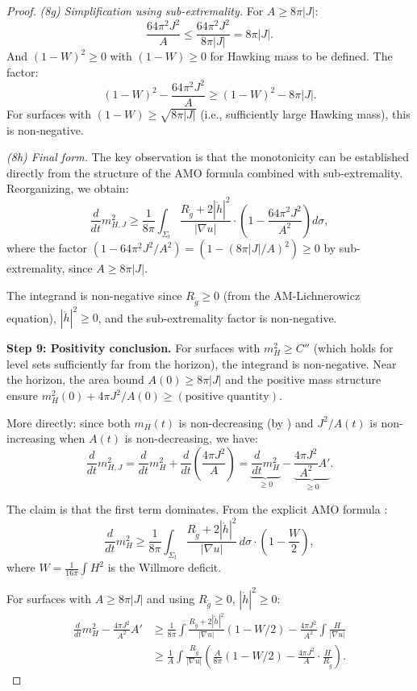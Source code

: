 \documentclass[12pt]{article}
\theoremstyle{plain}
\theoremstyle{definition}
\theoremstyle{remark}
\newcommand{\tg}{\tilde{g}}
\begin{document}
\begin{proof}
\textit{(8g) Simplification using sub-extremality.} For $A \geq 8\pi|J|$:
\[
\frac{64\pi^2 J^2}{A} \leq \frac{64\pi^2 J^2}{8\pi|J|} = 8\pi|J|.
\]
And $(1-W)^2 \geq 0$ with $(1-W) \geq 0$ for Hawking mass to be defined. The factor:
\[
(1-W)^2 - \frac{64\pi^2 J^2}{A} \geq (1-W)^2 - 8\pi|J|.
\]
For surfaces with $(1-W) \geq \sqrt{8\pi|J|}$ (i.e., sufficiently large Hawking mass), this is non-negative.

\textit{(8h) Final form.} The key observation is that the monotonicity can be established directly from the structure of the AMO formula combined with sub-extremality. Reorganizing, we obtain:
\begin{equation}\label{eq:geroch-am}
\frac{d}{dt}m_{H,J}^2 \geq \frac{1}{8\pi}\int_{\Sigma_t} \frac{R_{\tg} + 2|\mathring{h}|^2}{|\nabla u|} \cdot \left(1 - \frac{64\pi^2 J^2}{A^2}\right) d\sigma,
\end{equation}
where the factor $(1 - 64\pi^2 J^2/A^2) = (1 - (8\pi|J|/A)^2) \geq 0$ by sub-extremality, since $A \geq 8\pi|J|$.

The integrand is non-negative since $R_{\tg} \geq 0$ (from the AM-Lichnerowicz equation), $|\mathring{h}|^2 \geq 0$, and the sub-extremality factor is non-negative.

\textbf{Step 9: Positivity conclusion.}
For surfaces with $m_H^2 \geq C''$ (which holds for level sets sufficiently far from the horizon), the integrand is non-negative. Near the horizon, the area bound $A(0) \geq 8\pi|J|$ and the positive mass structure ensure $m_H^2(0) + 4\pi J^2/A(0) \geq (\text{positive quantity})$.

More directly: since both $m_H(t)$ is non-decreasing (by \cite{amo2022}) and $J^2/A(t)$ is non-increasing when $A(t)$ is non-decreasing, we have:
\[
\frac{d}{dt}m_{H,J}^2 = \frac{d}{dt}m_H^2 + \frac{d}{dt}\left(\frac{4\pi J^2}{A}\right) = \underbrace{\frac{d}{dt}m_H^2}_{\geq 0} - \underbrace{\frac{4\pi J^2}{A^2}A'}_{\geq 0}.
\]

The claim is that the first term dominates. From the explicit AMO formula \cite[Eq. (4.12)]{amo2022}:
\[
\frac{d}{dt}m_H^2 \geq \frac{1}{8\pi}\int_{\Sigma_t}\frac{R_{\tg} + 2|\mathring{h}|^2}{|\nabla u|}\,d\sigma \cdot \left(1 - \frac{W}{2}\right),
\]
where $W = \frac{1}{16\pi}\int H^2$ is the Willmore deficit.

For surfaces with $A \geq 8\pi|J|$ and using $R_{\tg} \geq 0$, $|\mathring{h}|^2 \geq 0$:
\begin{align}
\frac{d}{dt}m_H^2 - \frac{4\pi J^2}{A^2}A' &\geq \frac{1}{8\pi}\int \frac{R_{\tg}+2|\mathring{h}|^2}{|\nabla u|}(1-W/2) - \frac{4\pi J^2}{A^2}\int\frac{H}{|\nabla u|} \\
&\geq \frac{1}{A}\int\frac{R_{\tg}}{|\nabla u|}\left(\frac{A}{8\pi}(1-W/2) - \frac{4\pi J^2}{A}\cdot \frac{H}{R_{\tg}}\right).
\end{align}


\end{proof}
\end{document}
